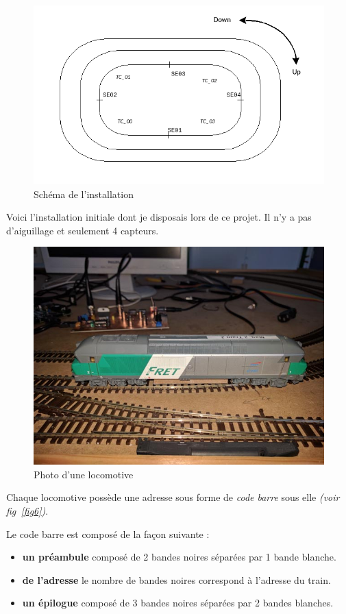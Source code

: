 \begin{figure}[h]
\centering
\includegraphics[scale=0.55]{circuit_vrai.png}
\caption{Sch\'ema de l'installation}
\label{schéma réél}
\end{figure}

Voici l'installation initiale dont je disposais lors de ce projet. Il n'y a pas
d'aiguillage et seulement 4 capteurs.


\begin{figure}[h]
\centering
\includegraphics[scale=0.27]{loco.jpg}
\caption{Photo d'une locomotive}
\label{fig5}
\end{figure}

\newpage

Chaque locomotive poss\`ede une adresse sous forme de \emph{code
barre} sous elle \emph{(voir fig~\ref{fig6})}.

Le code barre est compos\'e de la façon suivante :
\begin{itemize}
    \item \textbf{un pr\'eambule} compos\'e de 2 bandes noires
      s\'epar\'ees par 1 bande blanche.
    \item \textbf{de l'adresse} le nombre de bandes noires correspond
      à l'adresse du train. 
    \item \textbf{un \'epilogue} compos\'e de 3 bandes noires
      s\'epar\'ees par 2 bandes blanches.
\end{itemize}

